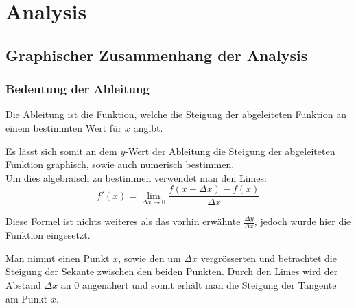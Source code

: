 \documentclass[a4paper,11pt]{report}
\begin{document}
\begin{titlepage}
    {\newUpperTitleFont\thetitle\par}
    \vspace{1cm}

    {\theauthor\par}
    \vspace{.5cm}

    {\thedate\par}
    \vspace{5cm}

\end{titlepage}
\part{Analysis}
\chapter{Graphischer Zusammenhang der Analysis}
\section{Bedeutung der Ableitung}
Die Ableitung ist die Funktion, welche die Steigung der abgeleiteten Funktion an einem bestimmten Wert für $x$ angibt. 

Es lässt sich somit an dem $y$-Wert der Ableitung die Steigung der abgeleiteten Funktion graphisch, sowie auch numerisch bestimmen.\\

Um dies algebraisch zu bestimmen verwendet man den Limes:
\begin{equation}
    f'(x) = \lim_{\Delta x \to 0} \frac{f(x+\Delta x)-f(x)}{\Delta x}
\end{equation}

Diese Formel ist nichts weiteres als das vorhin erwähnte $\frac{\Delta y}{\Delta x}$, jedoch wurde hier die Funktion eingesetzt.

Man nimmt einen Punkt $x$, sowie den um $\Delta x$ vergrösserten und betrachtet die Steigung der Sekante zwischen den beiden Punkten. Durch den Limes wird der Abstand $\Delta x$ an 0 angenähert und somit erhält man die Steigung der Tangente am Punkt $x$.
\begin{center}
\end{center}
\end{document}
